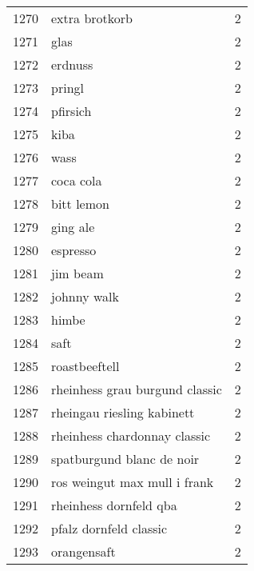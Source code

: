 \begin{tabular}{llr}
1270 &                                     extra brotkorb &      2 \\
1271 &                                               glas &      2 \\
1272 &                                            erdnuss &      2 \\
1273 &                                             pringl &      2 \\
1274 &                                           pfirsich &      2 \\
1275 &                                               kiba &      2 \\
1276 &                                               wass &      2 \\
1277 &                                          coca cola &      2 \\
1278 &                                         bitt lemon &      2 \\
1279 &                                           ging ale &      2 \\
1280 &                                           espresso &      2 \\
1281 &                                           jim beam &      2 \\
1282 &                                        johnny walk &      2 \\
1283 &                                              himbe &      2 \\
1284 &                                               saft &      2 \\
1285 &                                      roastbeeftell &      2 \\
1286 &                     rheinhess grau burgund classic &      2 \\
1287 &                         rheingau riesling kabinett &      2 \\
1288 &                       rheinhess chardonnay classic &      2 \\
1289 &                          spatburgund blanc de noir &      2 \\
1290 &                       ros weingut max mull i frank &      2 \\
1291 &                             rheinhess dornfeld qba &      2 \\
1292 &                             pfalz dornfeld classic &      2 \\
1293 &                                        orangensaft &      2 \\

\end{tabular}
